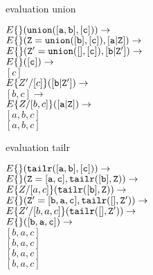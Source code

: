 \begin{frame}{evaluation union}

\begin{eval}
\pause$E\lbrace\rbrace({\tt union([a,b], [c])}) \rightarrow $\\
\pause\hspace{20pt}$E\lbrace\rbrace({\tt Z = union([b], [c]), [a|Z]}) \rightarrow $\\
\pause\hspace{40pt}$E\lbrace\rbrace({\tt Z' = union([],[c]), [b|Z']}) \rightarrow $\\
\pause\hspace{60pt}$E\lbrace\rbrace({\tt [c]}) \rightarrow $\\
\pause\hspace{60pt}$[c]$\\
\pause\hspace{40pt}$E\lbrace Z'/[c]\rbrace({\tt [b|Z']}) \rightarrow $\\
\pause\hspace{40pt}$[b,c]\rightarrow $\\
\pause\hspace{20pt}$E\lbrace Z/[b,c]\rbrace({\tt [a|Z]}) \rightarrow $\\
\pause\hspace{20pt}$[a,b,c]$\\
$[a,b,c]$
\end{eval}

\end{frame}


\begin{frame}{evaluation tailr}

\begin{eval}
\pause$E\lbrace\rbrace({\tt tailr([a,b], [c])}) \rightarrow $\\
\pause\hspace{20pt}$E\lbrace\rbrace({\tt Z = [a,c], tailr([b], Z)}) \rightarrow $\\
\pause\hspace{20pt}$E\lbrace Z/[a,c]\rbrace({\tt tailr([b], Z)}) \rightarrow $\\
\pause\hspace{40pt}$E\lbrace \rbrace({\tt Z' = [b,a,c], tailr([], Z')}) \rightarrow $\\
\pause\hspace{40pt}$E\lbrace Z'/[b,a,c]\rbrace({\tt tailr([], Z')}) \rightarrow $\\
\pause\hspace{60pt}$E\lbrace \rbrace({\tt [b,a,c]}) \rightarrow $\\
\pause\hspace{60pt}$[b,a,c]$\\
\pause\hspace{40pt}$[b,a,c]$\\
\pause\hspace{20pt}$[b,a,c]$\\
$[b,a,c]$\\
\end{eval}

\end{frame}

